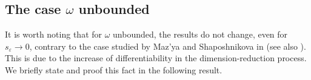 \documentclass[11pt]{article}
\newtheorem{remark}[definition]{Remark}
\def\e{\varepsilon}
\begin{document}


\subsection{The case $\omega$ unbounded}
It is worth noting that for $\omega$ unbounded, the results do not change, even for $s_\e\to 0$, contrary to the case studied by Maz'ya and Shaposhnikova in \cite{MS} (see also \cite{MR4165063,MR4453966, MR4953682,pin25, MR4374610}).
This is due to the increase of differentiability in the dimension-reduction process. We briefly state and proof this fact in the following result.
\end{document}
